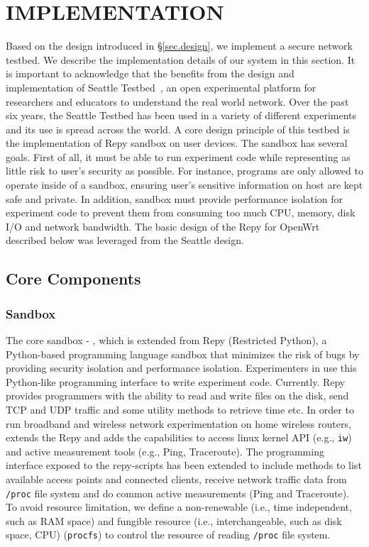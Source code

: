 \chapter{IMPLEMENTATION} 
\label{sec.implementation}
Based on the design introduced in \S{\ref{sec.design}}, we implement a 
secure network testbed. We describe the implementation details of our system 
in this section. It is important to acknowledge that the \sysname benefits from the design and implementation of Seattle Testbed~\cite{cappos2009seattle}, an open experimental platform for researchers and educators to understand the real world network. Over the past six years, the Seattle Testbed has been used in a variety of different experiments and its use is spread across the world. A core design principle of this testbed is the implementation of Repy sandbox on user devices. The sandbox has several goals. First of all, it must be able to run experiment code while representing as little risk to user's security as possible. For instance, programs are only allowed to operate inside of a sandbox, ensuring user's sensitive information on host are kept safe and private. In addition, sandbox must provide performance isolation for experiment code to prevent them from consuming too much CPU, memory, disk I/O and network bandwidth. The basic design of the Repy for OpenWrt described below was leveraged from the Seattle design.

\section{Core Components}
\subsection{Sandbox}
\label{sec.sandbox}
The core sandbox - \sandboxname, which is extended from Repy (Restricted Python), a Python-based programming language sandbox that minimizes the risk of bugs by providing security isolation and performance isolation. Experimenters in \sysname use this Python-like programming interface to write experiment code. Currently. Repy provides programmers with the ability to read and write files on the disk, send TCP and UDP traffic and some utility methods to retrieve time etc. In order to run broadband and wireless network experimentation on home wireless routers, \sysname extends the Repy and adds the capabilities to access linux kernel API (e.g., \texttt{iw}) and active measurement tools (e.g., Ping, Traceroute). The programming interface exposed to the repy-scripts has been extended to include methods to list available access points and connected clients, receive network traffic data from \texttt{/proc} file system and do common active measurements (Ping and Traceroute). To avoid resource limitation, we define a non-renewable (i.e., time independent, such as RAM space) and fungible resource (i.e., interchangeable, such as disk space, CPU) \cite{li2015fence} (\texttt{procfs}) to control the resource of reading \texttt{/proc} file system. 

